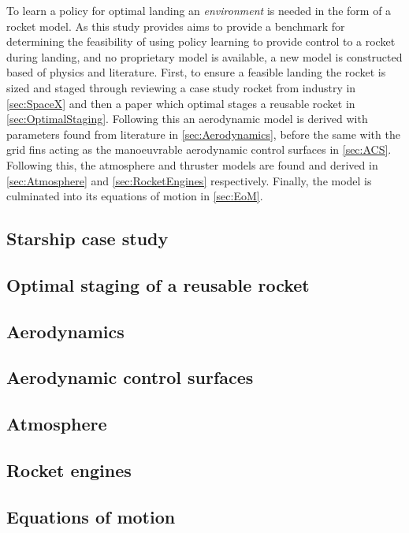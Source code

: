 
To learn a policy for optimal landing an \textit{environment} is needed in the form of a rocket model. As this study provides aims to provide a benchmark for determining the feasibility of using policy learning to provide control to a rocket during landing, and no proprietary model is available, a new model is constructed based of physics and literature. First, to ensure a feasible landing the rocket is sized and staged through reviewing a case study rocket from industry in \autoref{sec:SpaceX} and then a paper which optimal stages a reusable rocket in \autoref{sec:OptimalStaging}. Following this an aerodynamic model is derived with parameters found from literature in \autoref{sec:Aerodynamics}, before the same with the grid fins acting as the manoeuvrable aerodynamic control surfaces in \autoref{sec:ACS}. Following this, the atmosphere and thruster models are found and derived in \autoref{sec:Atmosphere} and \autoref{sec:RocketEngines} respectively. Finally, the model is culminated into its equations of motion in \autoref{sec:EoM}.


\subsection{Starship case study}
\label{sec:SpaceX}


\subsection{Optimal staging of a reusable rocket}
\label{sec:OptimalStaging}


\subsection{Aerodynamics}
\label{sec:Aerodynamics}


\subsection{Aerodynamic control surfaces}
\label{sec:ACS}


\subsection{Atmosphere}
\label{sec:Atmosphere}


\subsection{Rocket engines}
\label{sec:RocketEngines}


\subsection{Equations of motion}
\label{sec:EoM}

